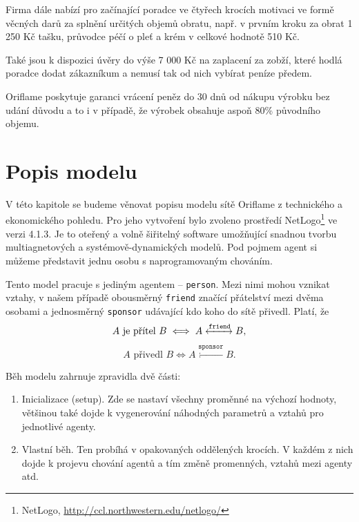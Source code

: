\documentclass[a4wide,12pt]{report}
\begin{document}
Firma dále nabízí pro začínající poradce ve čtyřech krocích motivaci ve formě věcných darů za splnění určitých objemů obratu, např. v prvním kroku za obrat 1 250 Kč tašku, průvodce péčí o pleť a krém v celkové hodnotě 510 Kč.

Také jsou k dispozici úvěry do výše 7 000 Kč na zaplacení za zobží, které hodlá poradce dodat zákazníkum a nemusí tak od nich vybírat peníze předem.

Oriflame poskytuje garanci vrácení peněz do 30 dnů od nákupu výrobku bez udání důvodu a to i v případě, že výrobek obsahuje aspoň 80\% původního objemu.



\chapter{Popis modelu}
V této kapitole se budeme věnovat popisu modelu sítě Oriflame z technického a ekonomického pohledu. Pro jeho vytvoření bylo zvoleno prostředí NetLogo\footnote{NetLogo, \url{http://ccl.northwestern.edu/netlogo/}} ve verzi 4.1.3. Je to oteřený a volně šiřitelný software umožňující snadnou tvorbu multiagnetových a systémově-dynamických modelů. Pod pojmem agent si můžeme představit jednu osobu s naprogramovaným chováním.

Tento model pracuje s jediným agentem -- \texttt{person}. Mezi nimi mohou vznikat vztahy, v našem případě obousměrný \texttt{friend} značící přátelství mezi dvěma osobami a jednosměrný \texttt{sponsor} udávající kdo koho do sítě přivedl. Platí, že
\[ A \text{ je přítel } B \iff A \xleftrightarrow{\texttt{friend}} B,\]
\[ A \text{ přivedl } B \iff A \xleftarrow{\texttt{sponsor}} B.\]

Běh modelu zahrnuje zpravidla dvě části:
\begin{enumerate}
\item Inicializace (setup). Zde se nastaví všechny proměnné na výchozí hodnoty, většinou také dojde k vygenerování náhodných parametrů a vztahů pro jednotlivé agenty.
\item Vlastní běh. Ten probíhá v opakovaných oddělených krocích. V každém z nich dojde k projevu chování agentů a tím změně promenných, vztahů mezi agenty atd.
\end{enumerate}
\end{document}
